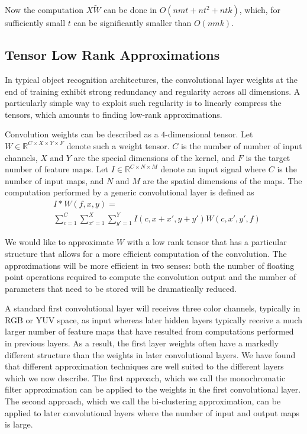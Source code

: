 \documentclass{article}
\begin{document}
Now the computation $X\tilde{W}$ can be done in $O(nmt + nt^2 + ntk)$, which, for sufficiently small $t$ can be significantly smaller than $O(nmk)$. 

\subsection{Tensor Low Rank Approximations}

In typical object recognition architectures, the convolutional layer weights at the end of training exhibit strong redundancy and regularity across all dimensions. A particularly simple way to exploit such regularity is to 
linearly compress the tensors, which amounts to finding low-rank approximations.

Convolution weights can be described as a $4$-dimensional tensor. Let $W \in \mathbb{R}^{C \times X \times Y \times F}$ 
denote such a weight tensor. $C$ is the number of number of input channels, $X$ and $Y$ are the special dimensions of the kernel, and $F$ is the target number of feature maps.
Let $I \in \mathbb{R}^{C \times N \times M}$ denote an input signal where $C$ is the number of input maps, and $N$ and $M$ are the spatial dimensions of the maps.
The computation performed by a generic convolutional layer is defined as
\begin{align*}
\label{convlayereq}
&I \ast W (f,x,y) = \\
&\sum_{c=1}^C \sum_{x'=1}^{X} \sum_{y'=1}^{Y} I(c,x+x',y+y') W(c,x',y',f)
\end{align*}

We would like to approximate $W$ with a low rank tensor that has a particular structure that allows for a more efficient computation of the convolution. The approximations will be more efficient in two senses: both the number of floating point operations required to compute the convolution output and the number of parameters that need to be stored will be dramatically reduced. 

A standard first convolutional layer will receives three color channels, typically in RGB or YUV space, as input whereas later hidden layers typically receive a much larger number of feature maps that have resulted from computations performed in previous layers. As a result, the first layer weights often have a markedly different structure than the weights in later convolutional layers. We have found that different approximation techniques are well suited to the different layers which we now describe. The first approach, which we call the monochromatic filter approximation can be applied to the weights in the first convolutional layer. The second approach, which we call the bi-clustering approximation,  can be applied to later convolutional layers where the number of input and output maps is large. 
\end{document}
